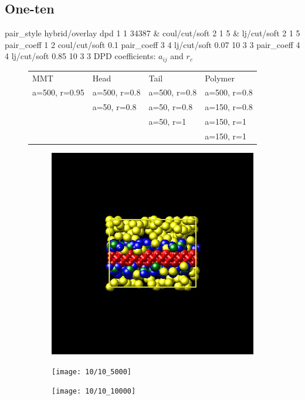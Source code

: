 \documentclass[a4paper]{article}
\begin{document}
\subsection*{One-ten}
pair\_style hybrid/overlay dpd 1 1 34387 \& coul/cut/soft 2 1 5 \& 
lj/cut/soft 2 1 5\newline
pair\_coeff 1 2 coul/cut/soft 0.1\newline
pair\_coeff 3 4 lj/cut/soft 0.07    10 3 3\newline
pair\_coeff 4 4 lj/cut/soft 0.85    10 3 3\newline
DPD coefficients: $a_{ij}$ and $r_c$
\begin{figure}[H]\begin{tabular}{llll}
MMT           & Head         & Tail         & Polymer      \\
a=500, r=0.95 & a=500, r=0.8 & a=500, r=0.8 & a=500, r=0.8 \\
              & a=50,  r=0.8 & a=50,  r=0.8 & a=150, r=0.8 \\
              &              & a=50,  r=1   & a=150, r=1   \\
              &              &              & a=150, r=1   \\
\end{tabular}\end{figure}

\begin{figure}[H]
\begin{subfigure}{0.3\textwidth}
  \centering
  \includegraphics[width=\linewidth,keepaspectratio]{start}
  \caption{}
\end{subfigure}
\begin{subfigure}{0.3\textwidth}
  \centering
  \texttt{[image: 10/10\_5000]}
  \caption{}
\end{subfigure}
\begin{subfigure}{0.3\textwidth}
  \centering
  \texttt{[image: 10/10\_10000]}
  \caption{}
\end{subfigure}
\caption{}
\label{fig_1}
\end{figure}
\end{document}
